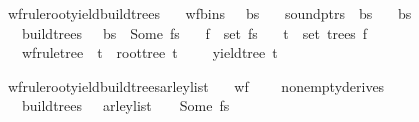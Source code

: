 \begin{isabellebody}
\isamarkupfalse%
\ wf{\isacharunderscore}{\kern0pt}rule{\isacharunderscore}{\kern0pt}root{\isacharunderscore}{\kern0pt}yield{\isacharunderscore}{\kern0pt}build{\isacharunderscore}{\kern0pt}trees{\isacharcolon}{\kern0pt}\isanewline
\ \ \ {\isachardoublequoteopen}wf{\isacharunderscore}{\kern0pt}bins\ {\isasymG}\ {\isasymomega}\ bs{\isachardoublequoteclose}\isanewline
\ \ \ {\isachardoublequoteopen}sound{\isacharunderscore}{\kern0pt}ptrs\ {\isasymomega}\ bs{\isachardoublequoteclose}\isanewline
\ \ \ {\isachardoublequoteopen}{\isacharbar}{\kern0pt}bs{\isacharbar}{\kern0pt}\ {\isacharequal}{\kern0pt}\ {\isacharbar}{\kern0pt}{\isasymomega}{\isacharbar}{\kern0pt}\ {\isacharplus}{\kern0pt}\ {}{\isachardoublequoteclose}\isanewline
\ \ \ {\isachardoublequoteopen}build{\isacharunderscore}{\kern0pt}trees\ {\isasymG}\ {\isasymomega}\ bs\ {\isacharequal}{\kern0pt}\ Some\ fs{\isachardoublequoteclose}\isanewline
\ \ \ {\isachardoublequoteopen}f\ {\isasymin}\ set\ fs{\isachardoublequoteclose}\isanewline
\ \ \ {\isachardoublequoteopen}t\ {\isasymin}\ set\ {\isacharparenleft}{\kern0pt}trees\ f{\isacharparenright}{\kern0pt}{\isachardoublequoteclose}\isanewline
\ \ \ {\isachardoublequoteopen}wf{\isacharunderscore}{\kern0pt}rule{\isacharunderscore}{\kern0pt}tree\ {\isasymG}\ t\ {\isasymand}\ root{\isacharunderscore}{\kern0pt}tree\ t\ {\isacharequal}{\kern0pt}\ {\isasymSS}\ {\isasymG}\ {\isasymand}\ yield{\isacharunderscore}{\kern0pt}tree\ t\ {\isacharequal}{\kern0pt}\ {\isasymomega}{\isachardoublequoteclose}%
\isadelimproof
%
\endisadelimproof
%
\isatagproof
%
\endisatagproof
{\isafoldproof}%
%
\isadelimproof
%
\endisadelimproof
%
\begin{isamarkuptext}%
%
\end{isamarkuptext}\isamarkuptrue%
\isamarkupfalse%
\ wf{\isacharunderscore}{\kern0pt}rule{\isacharunderscore}{\kern0pt}root{\isacharunderscore}{\kern0pt}yield{\isacharunderscore}{\kern0pt}build{\isacharunderscore}{\kern0pt}trees{\isacharunderscore}{\kern0pt}{\isasymE}arley{\isacharunderscore}{\kern0pt}list{\isacharcolon}{\kern0pt}\isanewline
\ \ \ {\isachardoublequoteopen}wf{\isacharunderscore}{\kern0pt}{\isasymG}\ {\isasymG}{\isachardoublequoteclose}\isanewline
\ \ \ {\isachardoublequoteopen}nonempty{\isacharunderscore}{\kern0pt}derives\ {\isasymG}{\isachardoublequoteclose}\isanewline
\ \ \ {\isachardoublequoteopen}build{\isacharunderscore}{\kern0pt}trees\ {\isasymG}\ {\isasymomega}\ {\isacharparenleft}{\kern0pt}{\isasymE}arley{\isacharunderscore}{\kern0pt}list\ {\isasymG}\ {\isasymomega}{\isacharparenright}{\kern0pt}\ {\isacharequal}{\kern0pt}\ Some\ fs{\isachardoublequoteclose}\isanewline

\end{isabellebody}

